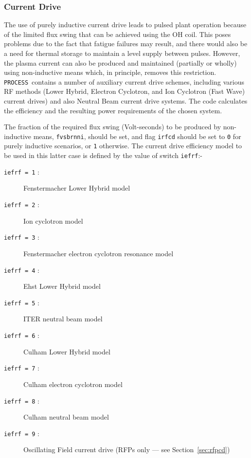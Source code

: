\documentclass[11pt,a4paper]{report}
\newcommand{\process}{\mbox{\texttt{PROCESS}}}
\begin{document}
\subsubsection{Current Drive}

The use of purely inductive current drive leads to pulsed plant operation
because of the limited flux swing that can be achieved using the OH coil. This
poses problems due to the fact that fatigue failures may result, and there
would also be a need for thermal storage to maintain a level supply between
pulses. However, the plasma current can also be produced and maintained
(partially or wholly) using non-inductive means which, in principle, removes
this restriction. \process\ contains a number of auxiliary current drive
schemes, including various RF methods (Lower Hybrid, Electron Cyclotron, and
Ion Cyclotron (Fast Wave) current drives) and also Neutral Beam current drive
systems. The code calculates the efficiency and the resulting power
requirements of the chosen system.

The fraction of the required flux swing (Volt-seconds) to be produced by
non-inductive means, \texttt{fvsbrnni}, should be set, and flag \texttt{irfcd}
should be set to \texttt{0} for purely inductive scenarios, or \texttt{1}
otherwise. The current drive efficiency model to be used in this latter case
is defined by the value of switch \texttt{iefrf}:-

\begin{description}
\item [\texttt{iefrf = 1} :] Fenstermacher Lower Hybrid model
\item [\texttt{iefrf = 2} :] Ion cyclotron model~\cite{IPDG}
\item [\texttt{iefrf = 3} :] Fenstermacher electron cyclotron resonance model
\item [\texttt{iefrf = 4} :] Ehst Lower Hybrid model
\item [\texttt{iefrf = 5} :] ITER neutral beam model~\cite{IPDG,172}
\item [\texttt{iefrf = 6} :] Culham Lower Hybrid model~\cite{172}
\item [\texttt{iefrf = 7} :] Culham electron cyclotron model~\cite{172}
\item [\texttt{iefrf = 8} :] Culham neutral beam model~\cite{172}
\item [\texttt{iefrf = 9} :] Oscillating Field current drive (RFPs only --- see
Section~\ref{sec:rfpcd})
\end{description}
\end{document}
